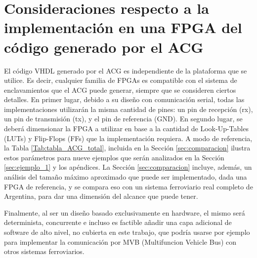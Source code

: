 \section{Consideraciones respecto a la implementación en una FPGA del código generado por el ACG}
	\label{sec:plataforma}
		
	
	El código VHDL generado por el ACG es independiente de la plataforma que se utilice. Es decir, cualquier familia de FPGAs es compatible con el sistema de enclavamientos que el ACG puede generar, siempre que se consideren ciertos detalles. En primer lugar, debido a su diseño con comunicación serial, todas las implementaciones utilizarán la misma cantidad de pines: un pin de recepción (rx), un pin de transmisión (tx), y el pin de referencia (GND). En segundo lugar, se deberá dimensionar la FPGA a utilizar en base a la cantidad de Look-Up-Tables (LUTs) y Flip-Flops (FFs) que la implementación requiera. A modo de referencia, la Tabla \ref{Tab:tabla_ACG_total}, incluida en la Sección \ref{sec:comparacion} ilustra estos parámetros para nueve ejemplos que serán analizados en la Sección \ref{sec:ejemplo_1} y los apéndices. La Sección \ref{sec:comparacion} incluye, además, un análisis del tamaño máximo aproximado que puede ser implementado, dada una FPGA de referencia, y se compara eso con un sistema ferroviario real completo de Argentina, para dar una dimensión del alcance que puede tener.
	
	Finalmente, al ser un diseño basado exclusivamente en hardware, el mismo será determinista, concurrente e incluso es factible añadir una capa adicional de software de alto nivel, no cubierta en este trabajo, que podría usarse por ejemplo para implementar la comunicación por MVB (Multifuncion Vehicle Bus) \cite{TCN} con otros sistemas ferroviarios.